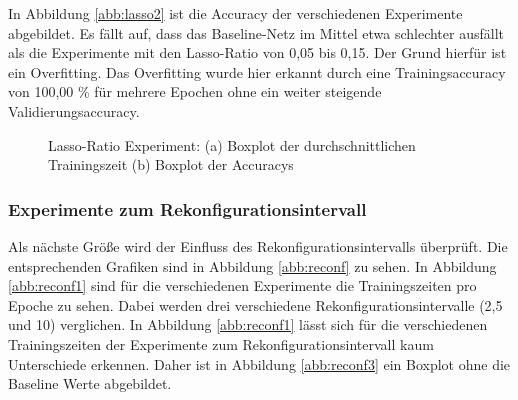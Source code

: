 In Abbildung \ref{abb:lasso2} ist die Accuracy der verschiedenen Experimente abgebildet. Es fällt auf, dass das Baseline-Netz im Mittel etwa schlechter ausfällt als die Experimente mit den Lasso-Ratio von 0,05 bis 0,15. Der Grund hierfür ist ein Overfitting. Das Overfitting wurde hier erkannt durch eine Trainingsaccuracy von 100,00 \% für mehrere Epochen ohne ein weiter steigende Validierungsaccuracy. 
\begin{figure}
     \centering
     \hfill
     \caption{Lasso-Ratio Experiment: (a) Boxplot der durchschnittlichen Trainingszeit (b) Boxplot der Accuracys}
     \label{abb:lasso}
\end{figure}




\subsubsection{Experimente zum Rekonfigurationsintervall}
 Als nächste Größe wird der Einfluss des Rekonfigurationsintervalls überprüft. Die entsprechenden Grafiken sind in Abbildung \ref{abb:reconf} zu sehen. In Abbildung \ref{abb:reconf1} sind für die verschiedenen Experimente die Trainingszeiten pro Epoche zu sehen. Dabei werden drei verschiedene Rekonfigurationsintervalle (2,5 und 10) verglichen. In Abbildung \ref{abb:reconf1} lässt sich für die verschiedenen Trainingszeiten der Experimente zum Rekonfigurationsintervall kaum Unterschiede erkennen. Daher ist in Abbildung \ref{abb:reconf3} ein Boxplot ohne die Baseline Werte abgebildet. 
 
